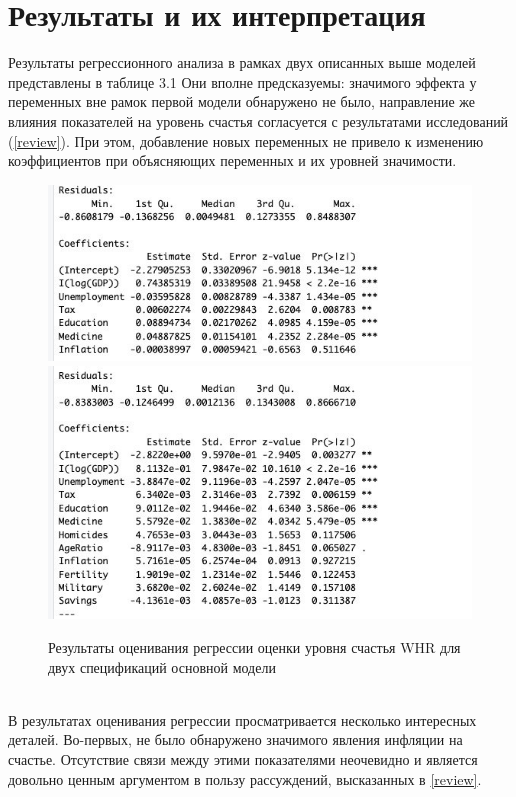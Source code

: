 \documentclass[russian]{vegareport}
\begin{document}
    \chapter{Результаты и их интерпретация}
        Результаты регрессионного анализа в рамках двух описанных выше моделей представлены в таблице 3.1 Они вполне предсказуемы: значимого эффекта у переменных вне рамок первой модели обнаружено не было, направление же влияния показателей на уровень счастья согласуется с результатами исследований (\ref{review}). При этом, добавление новых переменных не привело к изменению коэффициентов при объясняющих переменных и их уровней значимости.
        \begin{figure}
            \centering
            \includegraphics[scale=0.9]{Report/table 2.jpg}
            \includegraphics[scale=0.9]{Report/table 1.jpg}
            \caption{Результаты оценивания регрессии оценки уровня счастья WHR для двух спецификаций основной модели}
            \label{lect02:pic1}
        \end{figure}
        \\
        В результатах оценивания регрессии просматривается несколько интересных деталей. Во-первых, не было обнаружено значимого явления инфляции на счастье. Отсутствие связи между этими показателями неочевидно и является довольно ценным аргументом в пользу рассуждений, высказанных в \ref{review}.
\end{document}
